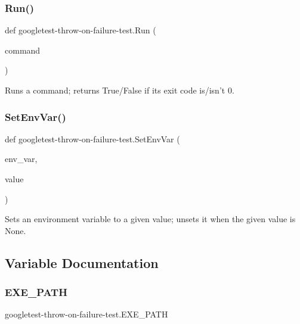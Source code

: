 \subsubsection{\texorpdfstring{Run()}{Run()}}
{\footnotesize\ttfamily def googletest-\/throw-\/on-\/failure-\/test.\+Run (\begin{DoxyParamCaption}\item[{}]{command }\end{DoxyParamCaption})}

\begin{DoxyVerb}Runs a command; returns True/False if its exit code is/isn't 0.\end{DoxyVerb}
 \mbox{\label{namespacegoogletest-throw-on-failure-test_a2e2bb374a68e4ae1db7c359b8005cbcc}} 
\subsubsection{\texorpdfstring{SetEnvVar()}{SetEnvVar()}}
{\footnotesize\ttfamily def googletest-\/throw-\/on-\/failure-\/test.\+Set\+Env\+Var (\begin{DoxyParamCaption}\item[{}]{env\+\_\+var,  }\item[{}]{value }\end{DoxyParamCaption})}

\begin{DoxyVerb}Sets an environment variable to a given value; unsets it when the
given value is None.
\end{DoxyVerb}
 

\subsection{Variable Documentation}
\mbox{\label{namespacegoogletest-throw-on-failure-test_a9cf7f6bcb466c8346b1aacec917a09c1}} 
\subsubsection{\texorpdfstring{EXE\_PATH}{EXE\_PATH}}
{\footnotesize\ttfamily googletest-\/throw-\/on-\/failure-\/test.\+E\+X\+E\+\_\+\+P\+A\+TH}

